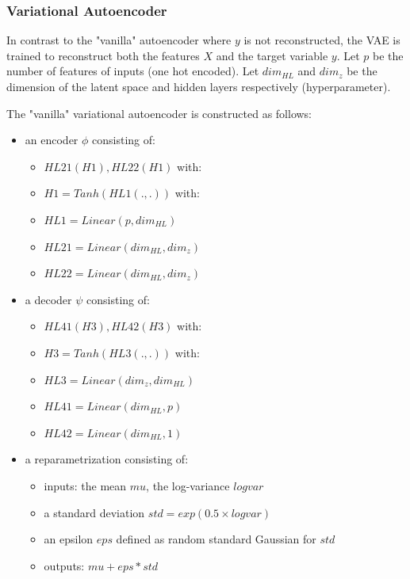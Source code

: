 \documentclass{article}
\theoremstyle{definition}
\begin{document}
\subsubsection{Variational Autoencoder}
\label{VAE_archi}
In contrast to the "vanilla" autoencoder where $y$ is not reconstructed, the VAE is trained to reconstruct both the features $X$ and the target variable $y$. 
Let $p$ be the number of features of inputs (one hot encoded). Let $dim_{HL}$ and $dim_z$ be the dimension of the latent space and hidden layers respectively (hyperparameter).

The "vanilla" variational autoencoder is constructed as follows: 
\begin{itemize}
    \item an encoder $\phi$ consisting of: 
    \begin{itemize}
        \item $HL21(H1), HL22(H1)$ with:
        \item $H1 = Tanh(HL1(.,.))$ with:
        \item $HL1 = Linear(p,dim_{HL})$
        \item $HL21 = Linear(dim_{HL},dim_z)$
        \item $HL22 = Linear(dim_{HL},dim_z)$
    \end{itemize}
    \item a decoder $\psi$ consisting of:
    \begin{itemize}
        \item $HL41(H3), HL42(H3)$ with:
        \item $H3 = Tanh(HL3(.,.))$ with:
        \item $HL3 = Linear(dim_z,dim_{HL})$
        \item $HL41 = Linear(dim_{HL},p)$
        \item $HL42 = Linear(dim_{HL},1)$
    \end{itemize}
    \item a reparametrization consisting of:
    \begin{itemize}
        \item inputs: the mean $mu$, the log-variance $logvar$
        \item a standard deviation $std=exp(0.5 \times logvar)$
        \item an epsilon $eps$ defined as random standard Gaussian for $std$
        \item outputs: $mu + eps*std $
    \end{itemize}
\end{itemize}
\end{document}
